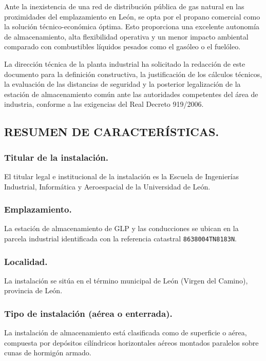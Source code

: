 \documentclass[12pt]{article}
\begin{document}
        Ante la inexistencia de una red de distribución pública de gas natural en las proximidades del emplazamiento en León, se opta por el propano comercial como la solución técnico-económica óptima. Esto proporciona una excelente autonomía de almacenamiento, alta flexibilidad operativa y un menor impacto ambiental comparado con combustibles líquidos pesados como el gasóleo o el fuelóleo.
        
        La dirección técnica de la planta industrial ha solicitado la redacción de este documento para la definición constructiva, la justificación de los cálculos técnicos, la evaluación de las distancias de seguridad y la posterior legalización de la estación de almacenamiento común ante las autoridades competentes del área de industria, conforme a las exigencias del Real Decreto 919/2006.

        \subsection{RESUMEN DE CARACTERÍSTICAS.}
            \subsubsection{Titular de la instalación.}
            El titular legal e institucional de la instalación es la Escuela de Ingenierías Industrial, Informática y Aeroespacial de la Universidad de León.
            
            \subsubsection{Emplazamiento.}
            La estación de almacenamiento de GLP y las conducciones se ubican en la parcela industrial identificada con la referencia catastral \texttt{8638004TN8183N}.
            
            \subsubsection{Localidad.}
            La instalación se sitúa en el término municipal de León (Virgen del Camino), provincia de León.
            
            \subsubsection{Tipo de instalación (aérea o enterrada).}
            La instalación de almacenamiento está clasificada como de superficie o aérea, compuesta por depósitos cilíndricos horizontales aéreos montados paralelos sobre cunas de hormigón armado.
            
\end{document}
